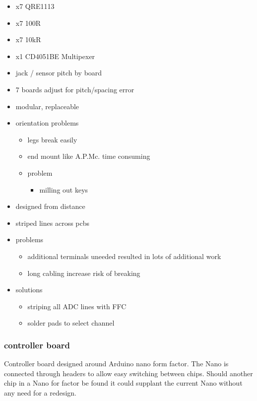 \begin{itemize}
\item
  x7 QRE1113
\item
  x7 100R
\item
  x7 10kR
\item
  x1 CD4051BE Multipexer
\item
  jack / sensor pitch by board
\item
  7 boards adjust for pitch/spacing error
\item
  modular, replaceable
\item
  orientation problems

  \begin{itemize}
  \item
    legs break easily
  \item
    end mount like A.P.Mc. time consuming
  \item
    problem

    \begin{itemize}
    \item
      milling out keys
    \end{itemize}
  \end{itemize}
\item
  designed from distance
\item
  striped lines across pcbs
\item
  problems

  \begin{itemize}
  \item
    additional terminals uneeded resulted in lots of additional work
  \item
    long cabling increase risk of breaking
  \end{itemize}
\item
  solutions

  \begin{itemize}
  \item
    striping all ADC lines with FFC
  \item
    solder pads to select channel
  \end{itemize}
\end{itemize}

\subsubsection{controller board}\label{controller-board}

Controller board designed around Arduino nano form factor. The Nano is
connected through headers to allow easy switching between chips. Should
another chip in a Nano for factor be found it could supplant the current
Nano without any need for a redesign.

